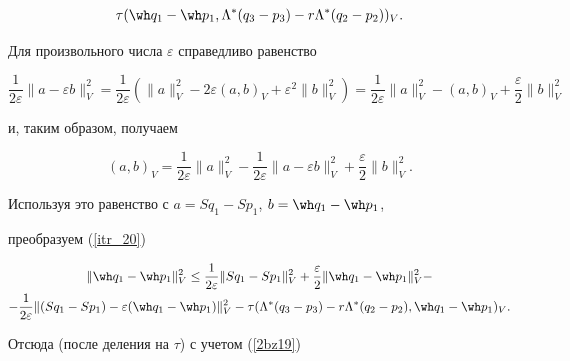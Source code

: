 \begin{pf}
\begin{multline}
\tau (\wh q_1-\wh p_1, \Lambda ^* (q_3-p_3)-r \Lambda ^* (q_2- p_2))_V .


\label{itr_20}


\end{multline}





Для произвольного числа $\varepsilon$ справедливо равенство


$$


\frac {1}{2 \varepsilon} \| {a-\varepsilon b} \|_V^2=\frac {1}{2 \varepsilon} 


({\| {a} \|_V^2-


2 \varepsilon (a , b)_V+\varepsilon^2 \| {b} \|_V^2 


})=\frac {1}{2 \varepsilon} \| {a} \|_V^2-(a , b)_V +


\frac {\varepsilon} {2} \| {b} \|_V^2 


$$


и, таким образом, получаем 


\begin{equation}


(a , b)_V=\frac {1}{2 \varepsilon} \| {a} \|_V^2-


\frac {1}{2 \varepsilon} \| {a-\varepsilon b} \|_V^2 +


\frac {\varepsilon} {2} \| {b} \|_V^2 . 


\label{itr_21}


\end{equation}





Используя это равенство с $a=S q_1-S p_1$, $b=\wh q_1-\wh p_1$,


преобразуем (\ref{itr_20})


\begin{multline*}


 \| {\wh q_1-\wh p_1} \|_V^2 \leq \frac {1}{2 \varepsilon} \| {S q_1-S p_1} \|_V^2 +


\frac {\varepsilon} {2} \| {\wh q_1-\wh p_1} \|_V^2-\\


%


-\frac {1}{2 \varepsilon} \| (S q_1-S p_1)-\varepsilon ({\wh q_1-\wh p_1}) \|_V^2 -


 \tau ({\Lambda ^* (q_3-p_3)-r \Lambda ^* (q_2- p_2), \wh q_1-\wh p_1})_V.


\end{multline*}


Отсюда (после деления на $\tau$) с учетом (\ref{2bz19})



\end{pf}
